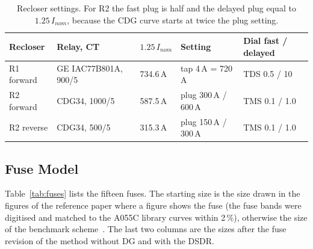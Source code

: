 \documentclass[12pt,letterpaper]{article}
\newcommand{\hd}{\rowcolor{headc}}
\begin{document}
\begin{table}[H]
\centering\small
\begin{tabularx}{\textwidth}{@{}lLlll@{}}
\toprule
\hd\textbf{Recloser} & \textbf{Relay, CT} & \textbf{$1.25\,I_{nom}$} & \textbf{Setting} & \textbf{Dial fast / delayed} \\
\midrule
R1 forward & GE IAC77B801A, 900/5 & 734.6\,A & tap 4\,A = 720\,A & TDS 0.5 / 10 \\
R2 forward & CDG34, 1000/5 & 587.5\,A & plug 300\,A / 600\,A & TMS 0.1 / 1.0 \\
R2 reverse & CDG34, 500/5 & 315.3\,A & plug 150\,A / 300\,A & TMS 0.1 / 1.0 \\
\bottomrule
\end{tabularx}
\caption{Recloser settings. For R2 the fast plug is half and the delayed plug equal to $1.25\,I_{nom}$, because
the CDG curve starts at twice the plug setting.}
\label{tab:settings}
\end{table}

\subsection{Fuse Model}
Table~\ref{tab:fuses} lists the fifteen fuses. The starting size is the size drawn in the figures of the
reference paper where a figure shows the fuse (the fuse bands were digitised and matched to the A055C
library curves within 2\,\%), otherwise the size of the benchmark scheme~\cite{yousaf2020}. The last two
columns are the sizes after the fuse revision of the method without DG and with the DSDR.
\end{document}
